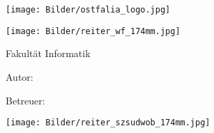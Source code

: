 \frontmatter
\begin{titlepage}
	\thispagestyle{titlepage}
	
	\hfill
	\texttt{[image: Bilder/ostfalia\_logo.jpg]}
	
	\texttt{[image: Bilder/reiter\_wf\_174mm.jpg]}
	
	\hspace{1cm}
	\begin{minipage}{\dimexpr\textwidth-1.5cm\relax}
		{\Large\textsf{Fakultät Informatik}}
	\end{minipage}
	
	\vfil
	
	\hspace{1cm}
	\begin{minipage}{\dimexpr\textwidth-1.5cm\relax}
		\hrulefill
		
		\vspace{2em}
		
		{\Large\textbf{\textsf{\documentsubject}}}
			
		\vspace{2em}
			
		{\Huge\textbf{\textsf{\documenttitle}}}
			
		\vspace{2em}
			
		{\Large\textsf{\documentsubtitle}}
		
		\vspace{1em}
		
		\hrulefill
	\end{minipage}	
	
	
	\vfil
	
	\hspace{1cm}
	\begin{minipage}{\dimexpr\textwidth-1.5cm\relax}
		{\Large\textsf{Autor: \documentauthor}}
		
		\vspace{0.5cm}		
		
		{\Large\textsf{Betreuer: \documenttutor}}
	\end{minipage}
	
	\vspace{2em}
	
	
	\enlargethispage{10\baselineskip}
	
	\texttt{[image: Bilder/reiter\_szsudwob\_174mm.jpg]}
	
\end{titlepage}

\restoregeometry
